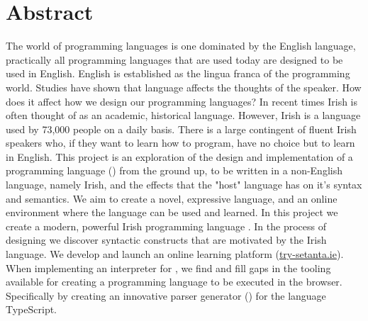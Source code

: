 \chapter{Abstract}
The world of programming languages is one dominated by the English language, practically all programming languages that are used today are designed to be used in English. English is established as the lingua franca of the programming world.
Studies have shown that language affects the thoughts of the speaker\cite{languagecolour}. How does it affect how we design our programming languages?
In recent times Irish is often thought of as an academic, historical language. However, Irish is a language used by 73,000 people on a daily basis\cite{csoirish}. There is a large contingent of fluent Irish speakers who, if they want to learn how to program, have no choice but to learn in English.
This project is an exploration of the design and implementation of a programming language (\Setanta{}) from the ground up, to be written in a non-English language, namely Irish, and the effects that the "host" language has on it's syntax and semantics. We aim to create a novel, expressive language, and an online environment where the language can be used and learned.
In this project we create a modern, powerful Irish programming language \Setanta{}. In the process of designing \Setanta{} we discover syntactic constructs that are motivated by the Irish language. We develop and launch an online learning platform (\href{https://try-setanta.ie}{try-setanta.ie}). When implementing an interpreter for \Setanta{}, we find and fill gaps in the tooling available for creating a programming language to be executed in the browser. Specifically by creating an innovative parser generator (\tsPEG{}) for the language TypeScript.
